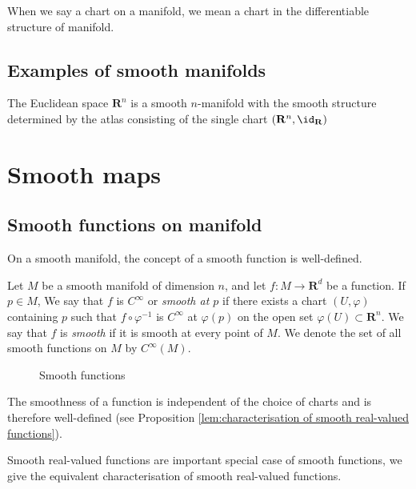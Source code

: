 \begin{notation}
    When we say a chart on a manifold, we mean a chart in the differentiable structure of manifold.
\end{notation}

\subsection{Examples of smooth manifolds}

\begin{example}
    The Euclidean space $\mathbf{R}^n$ is a smooth $n$-manifold with the smooth structure determined by the atlas consisting of the single chart $(\mathbf{R}^n, \id_{\mathbf{R}})$
\end{example}

\section{Smooth maps}

\subsection{Smooth functions on manifold}
On a smooth manifold, the concept of a smooth function is well-defined.
\begin{definition}
    Let $M$ be a smooth manifold of dimension $n$, and let $f : M \to \mathbf{R}^d$ be a function. If $p \in M$, We say that $f$ is $C^\infty$ or \emph{smooth at $p$} if there exists a chart $(U, \varphi)$ containing $p$ such that $f \circ \varphi^{-1}$ is $C^\infty$ at $\varphi(p)$ on the open set $\varphi(U) \subset \mathbf{R}^n$. We say that $f$ is \emph{smooth} if it is smooth at every point of $M$. We denote the set of all smooth functions on $M$ by $C^\infty(M)$.
\end{definition}

\begin{figure}[h]
    \centering
    
    \caption{Smooth functions}
\end{figure}

\begin{remark}
    The smoothness of a function is independent of the choice of charts and is therefore well-defined (see Proposition \ref{lem:characterisation of smooth real-valued functions}).
\end{remark}

Smooth real-valued functions are important special case of smooth functions, we give the equivalent characterisation of smooth real-valued functions.

